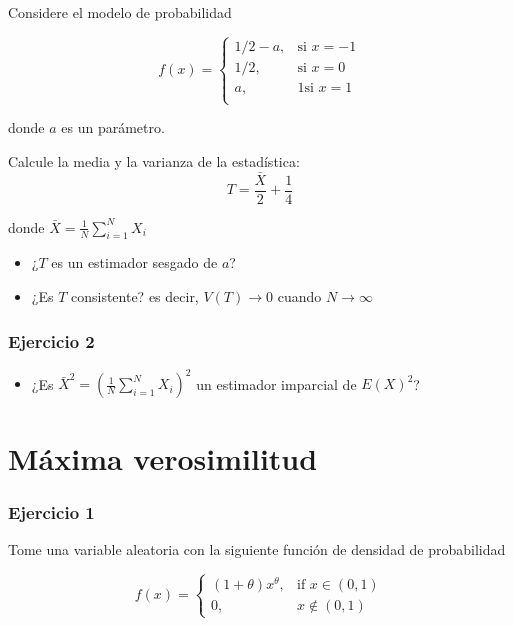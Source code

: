 \documentclass[
]{book}
\providecommand{\tightlist}{%
  \setlength{\itemsep}{0pt}\setlength{\parskip}{0pt}}
\begin{document}
Considere el modelo de probabilidad

\[
    f(x)= 
\begin{cases}
    1/2-a,& \text{si } x=-1 \\ 
    1/2,& \text{si } x=0\\
    a,& 1 \text{si } x=1\\ 
\end{cases}
\]

donde \(a\) es un parámetro.

Calcule la media y la varianza de la estadística: \[T=\frac{\bar{X}}{2}+\frac{1}{4}\]

donde \(\bar{X}=\frac{1}{N}\sum_{i=1}^N X_i\)

\begin{itemize}
\item
  ¿\(T\) es un estimador sesgado de \(a\)?
\item
  ¿Es \(T\) consistente? es decir, \(V(T) \rightarrow 0\) cuando \(N\rightarrow \infty\)
\end{itemize}

\hypertarget{ejercicio-2-6}{%
\subsubsection{Ejercicio 2}\label{ejercicio-2-6}}

\begin{itemize}
\tightlist
\item
  ¿Es \(\bar{X}^2=(\frac{1}{N}\sum_{i=1}^N X_i)^2\) un estimador imparcial de \(E(X)^2\)?
\end{itemize}

\hypertarget{muxe1xima-verosimilitud-3}{%
\section{Máxima verosimilitud}\label{muxe1xima-verosimilitud-3}}

\hypertarget{ejercicio-1-7}{%
\subsubsection{Ejercicio 1}\label{ejercicio-1-7}}

Tome una variable aleatoria con la siguiente función de densidad de probabilidad

\[
f(x)=
\begin{cases}
    (1+\theta)x^\theta,& \text{if } x\in (0,1)\\
    0,&x\notin (0,1)
\end{cases}
\]
\end{document}
